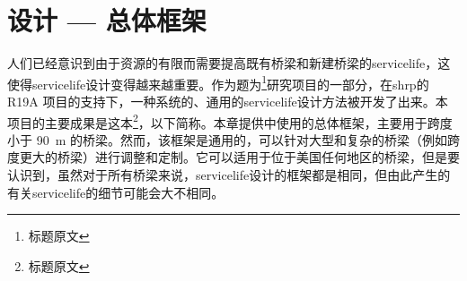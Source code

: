 \chapter{设计 — 总体框架}
\label{chp:general-frame}
人们已经意识到由于资源的有限而需要提高既有桥梁和新建桥梁的\gls*{servicelife}，这使得\gls*{servicelife}设计变得越来越重要。作为题为\footnote{标题原文}研究项目的一部分，在\acrfull{shrp}的 R19A 项目的支持下，一种系统的、通用的\gls*{servicelife}设计方法被开发了出来。本项目的主要成果是这本\footnote{标题原文}，以下简称。本章提供中使用的总体框架，主要用于跨度小于 \qty{90}{m} 的桥梁。然而，该框架是通用的，可以针对大型和复杂的桥梁（例如跨度更大的桥梁）进行调整和定制。它可以适用于位于美国任何地区的桥梁，但是要认识到，虽然对于所有桥梁来说，\gls*{servicelife}设计的框架都是相同，但由此产生的有关\gls{servicelife}的细节可能会大不相同。


